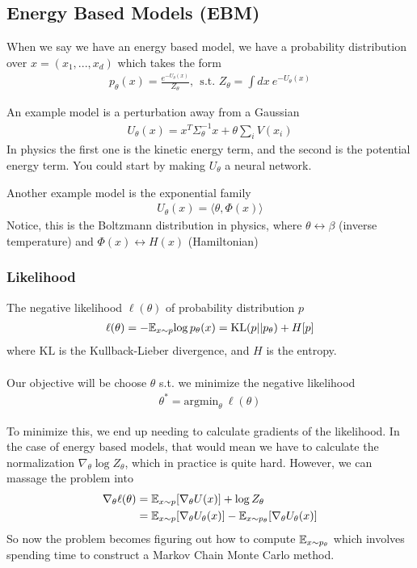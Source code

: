 \subsection{Energy Based Models (EBM)}
When we say we have an energy based model, we have a probability distribution over $x = (x_1, ..., x_d)$ which takes the form
\begin{align}
	p_\theta(x) = \frac{e^{- U_\theta(x)}}{Z_\theta}, \ \ \text{s.t. } Z_\theta = \int dx ~e^{-U_\theta(x)}
\end{align}
\begin{example}
	An example model is a perturbation away from a Gaussian
\begin{align}
	U_\theta(x) = x^T \Sigma_\theta^{-1} x + \theta \sum_i V(x_i)
\end{align}
In physics the first one is the kinetic energy term, and the second is the potential energy term. You could start by making $U_\theta$ a neural network.
\end{example}
\begin{example}
	Another example model is the exponential family
	\begin{align}
		U_\theta(x) = \langle \theta, \Phi(x) \rangle
	\end{align}
	Notice, this is the Boltzmann distribution in physics, where $\theta \leftrightarrow \beta$ (inverse temperature) and $\Phi(x) \leftrightarrow H(x)$ (Hamiltonian)
\end{example}
\subsubsection{Likelihood}
\begin{definition}
	[Likelihood] The negative likelihood $\ell(\theta)$ of probability distribution $p$
	\begin{align}
		\ell(\theta) = - \mathbb{E}_{x\sim p}{\log p_\theta(x)} = \text{KL}(p || p_\theta) + H[p]
	\end{align}
	where $\text{KL}$ is the Kullback-Lieber divergence, and $H$ is the entropy.\\
	\\
	Our objective will be choose $\theta$ s.t. we minimize the negative likelihood
	\begin{align}
		\theta^* = \text{argmin}_\theta ~ \ell(\theta)
	\end{align}
\end{definition}
To minimize this, we end up needing to calculate gradients of the likelihood. In the case of energy based models, that would mean we have to calculate the normalization $\nabla_\theta \log Z_\theta$, which in practice is quite hard. However, we can massage the problem into
\begin{align}
	\nabla_\theta \ell(\theta) & = \mathbb{E}_{x \sim p} [\nabla_\theta U(x)] + \log Z_\theta\\
	& = \mathbb E_{x \sim p}[\nabla_\theta U_\theta(x)]- \mathbb{E}_{x \sim p_\theta}[\nabla_\theta U_\theta(x)]
\end{align}
So now the problem becomes figuring out how to compute $\mathbb{E}_{x \sim p_\theta}$ which involves spending time to construct a Markov Chain Monte Carlo method.

